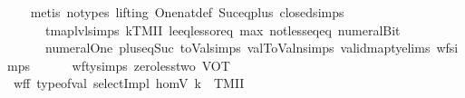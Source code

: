 \begin{isabellebody}
%
\isadelimproof
\ \ %
\endisadelimproof
%
\isatagproof
{}\isamarkupfalse%
\ {\isacharparenleft}{\kern0pt}metis\ {\isacharparenleft}{\kern0pt}no{\isacharunderscore}{\kern0pt}types{\isacharcomma}{\kern0pt}\ lifting{\isacharparenright}{\kern0pt}\ One{\isacharunderscore}{\kern0pt}nat{\isacharunderscore}{\kern0pt}def\ Suc{\isacharunderscore}{\kern0pt}eq{\isacharunderscore}{\kern0pt}plus{}\ closed{\isachardot}{\kern0pt}simps{\isacharparenleft}{\kern0pt}{}{\isacharcomma}{\kern0pt}{}{\isacharparenright}{\kern0pt}\isanewline
\ \ \ \ \ \ tmap{\isacharunderscore}{\kern0pt}lvl{\isachardot}{\kern0pt}simps{\isacharparenleft}{\kern0pt}{}{\isacharcomma}{\kern0pt}{}{\isacharparenright}{\kern0pt}\ kTMII\ le{\isacharunderscore}{\kern0pt}eq{\isacharunderscore}{\kern0pt}less{\isacharunderscore}{\kern0pt}or{\isacharunderscore}{\kern0pt}eq\ max{\isacharunderscore}{\kern0pt}{}{\isacharunderscore}{\kern0pt}{}{\isacharparenleft}{\kern0pt}{}{\isacharparenright}{\kern0pt}\ not{\isacharunderscore}{\kern0pt}less{\isacharunderscore}{\kern0pt}eq{\isacharunderscore}{\kern0pt}eq\ numeral{\isacharunderscore}{\kern0pt}Bit{}\isanewline
\ \ \ \ \ \ numeral{\isacharunderscore}{\kern0pt}One\ plus{\isacharunderscore}{\kern0pt}{}{\isacharunderscore}{\kern0pt}eq{\isacharunderscore}{\kern0pt}Suc\ toVal{}{\isachardot}{\kern0pt}simps{\isacharparenleft}{\kern0pt}{}{\isacharparenright}{\kern0pt}\ val{}ToValn{\isachardot}{\kern0pt}simps{\isacharparenleft}{\kern0pt}{}{\isacharparenright}{\kern0pt}\ valid{\isacharunderscore}{\kern0pt}mapty{\isachardot}{\kern0pt}elims{\isacharparenleft}{\kern0pt}{}{\isacharparenright}{\kern0pt}\ wf{\isachardot}{\kern0pt}simps\isanewline
\ \ \ \ \ \ wf{\isacharunderscore}{\kern0pt}ty{\isachardot}{\kern0pt}simps{\isacharparenleft}{\kern0pt}{}{\isacharcomma}{\kern0pt}{}{\isacharparenright}{\kern0pt}\ zero{\isacharunderscore}{\kern0pt}less{\isacharunderscore}{\kern0pt}two\ VOT{\isacharparenright}{\kern0pt}%
\endisatagproof
{\isafoldproof}%
%
\isadelimproof
\isanewline
%
\endisadelimproof
\isanewline
\isanewline
{}\isamarkupfalse%
\ wff{\isacharcolon}{\kern0pt}\ {\isachardoublequoteopen}type{\isacharunderscore}{\kern0pt}of{\isacharunderscore}{\kern0pt}val\ {\isacharparenleft}{\kern0pt}selectImpl\ homV\ k{\isacharparenright}{\kern0pt}\ {\isacharequal}{\kern0pt}\ TMII{\isachardoublequoteclose}\isanewline
%
\isadelimproof
\ \ %
\endisadelimproof

\end{isabellebody}
